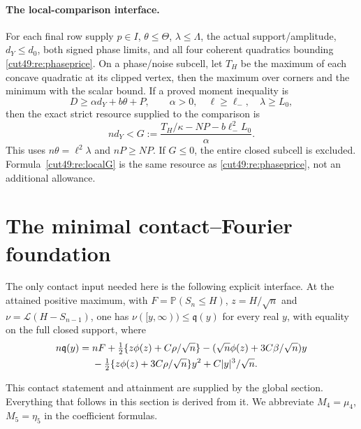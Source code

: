 \documentclass[11pt,a4paper]{article}
\numberwithin{equation}{section}
\theoremstyle{definition}
\theoremstyle{remark}
\newcommand{\Pp}{\mathbb P}
\begin{document}
\paragraph{The local-comparison interface.}
For each final row supply $p\in I$, $\theta\le\Theta$, $\lambda\le\Lambda$,
the actual support/amplitude, $d_Y\le d_0$, both signed phase limits,
and all four coherent quadratics bounding \eqref{cut49:re:phaseprice}.
On a phase/noise subcell, let $T_H$ be the maximum of each concave
quadratic at its clipped vertex, then the maximum over corners and the
minimum with the scalar bound. If a proved moment inequality is
\[
 D\ge\alpha d_Y+b\theta+P,\qquad\alpha>0,
 \quad \ell\ge\ell_-,\quad\lambda\ge L_0,
\]
then the exact strict resource supplied to the comparison is
\begin{equation}\label{cut49:re:localG}
 nd_Y<G:=\frac{T_H/\kappa-NP-b\ell_-^2L_0}{\alpha}.
\end{equation}
This uses $n\theta=\ell^2\lambda$ and $nP\ge NP$. If $G\le0$,
the entire closed subcell is excluded. Formula~\eqref{cut49:re:localG} is
the same resource as \eqref{cut49:re:phaseprice}, not an additional allowance.

\section{The minimal contact--Fourier foundation}\label{cut49:re:foundation}
The only contact input needed here is the following explicit interface.
At the attained positive maximum, with $F=\Pp(S_n\le H)$,
$z=H/\sqrt n$ and $\nu=\mathcal L(H-S_{n-1})$, one has
$\nu([y,\infty))\le\mathfrak q(y)$ for every real $y$, with equality
on the full closed support, where
\begin{align}
 n\mathfrak q(y)={}&nF+\tfrac12\{z\phi(z)+C\rho/\sqrt n\}
 -(\sqrt n\phi(z)+3C\beta/\sqrt n)y\notag\\
 &-\tfrac12\{z\phi(z)+3C\rho/\sqrt n\}y^2
 +C|y|^3/\sqrt n.\label{cut49:re:contact-q}
\end{align}

This contact statement and attainment are supplied by the global section.
Everything that follows in this section is derived from it. We abbreviate
$M_4=\mu_4$, $M_5=\eta_5$ in the coefficient formulas.
\end{document}
